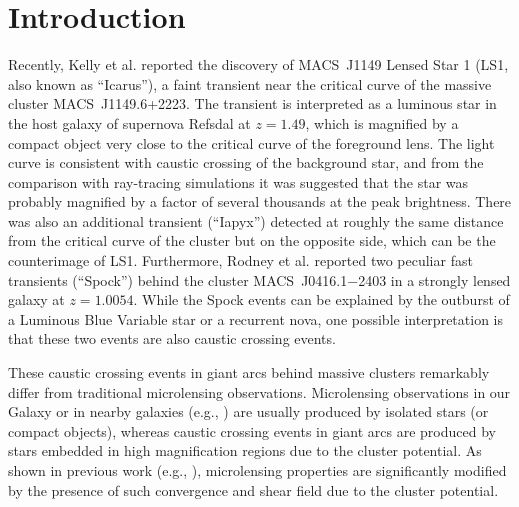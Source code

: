 \documentclass[showpacs,twocolumn,preprintnumbers,amsmath,amssymb,superscriptaddress,nofootinbib]{revtex4}
\begin{document}

\maketitle

\section{Introduction}
\label{sec:intro}

Recently, Kelly et al. \cite{Kelly:2017fps} reported the discovery of
MACS~J1149 Lensed Star 1 (LS1, also known as ``Icarus''), a faint
transient near the critical curve of the massive cluster
MACS~J1149.6+2223. The transient is interpreted as a luminous star in
the host galaxy of supernova Refsdal \cite{Kelly:2014mwa} at $z=1.49$,
which is magnified by a compact object very close to the critical
curve of the foreground lens. The light curve is consistent with caustic
crossing of the background star, and from the comparison with
ray-tracing simulations it was suggested that the star was probably
magnified by a factor of several thousands at the peak
brightness. There was also an additional transient (``Iapyx'') detected at
roughly the same distance from the critical curve of the cluster but
on the opposite side, which can be the counterimage of LS1. Furthermore,
Rodney et al. \cite{Rodney:2017aaa} reported two peculiar fast
transients (``Spock'') behind the cluster MACS~J0416.1$-$2403 in a
strongly lensed galaxy at $z=1.0054$. While the Spock events can be
explained by the outburst of a Luminous Blue Variable star or a
recurrent nova, one possible interpretation is that these two events
are also caustic crossing events.   

These caustic crossing events in giant arcs behind massive clusters
remarkably differ from traditional microlensing
observations. Microlensing observations in our Galaxy or in
nearby galaxies (e.g.,
\cite{Alcock:1993qc,Udalski:1994ei,Alcock:2000ph,Sumi:2002wg,deJong:2005jm,Tisserand:2006zx,Griest:2013esa,Niikura:2017zjd})
are usually produced by isolated stars (or compact objects), whereas
caustic crossing events in giant arcs are produced by stars embedded
in high magnification regions due to the cluster potential. As shown
in previous work (e.g.,  
\cite{Chang:1979zz,Paczynski:1986aa,Kayser:1986aa,Witt:1990aa,Schechter:2002dm}),
microlensing properties are significantly modified by the presence of
such convergence and shear field due to the cluster potential.
\end{document}
